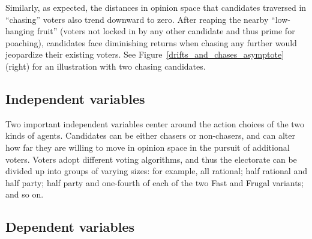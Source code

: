Similarly, as expected, the distances in opinion space that candidates
traversed in ``chasing'' voters also trend downward to zero. After reaping the
nearby ``low-hanging fruit'' (voters not locked in by any other candidate and
thus prime for poaching), candidates face diminishing returns when chasing any
further would jeopardize their existing voters. See
Figure~\ref{drifts_and_chases_asymptote} (right) for an illustration with two
chasing candidates.


\subsection{Independent variables}


Two important independent variables center around the action choices of the two
kinds of agents. Candidates can be either chasers or non-chasers, and can alter
how far they are willing to move in opinion space in the pursuit of additional
voters. Voters adopt different voting algorithms, and thus the electorate can
be divided up into groups of varying sizes: for example, all rational; half
rational and half party; half party and one-fourth of each of the two Fast and
Frugal variants; and so on.

%
%
%
%
%    


\subsection{Dependent variables}


